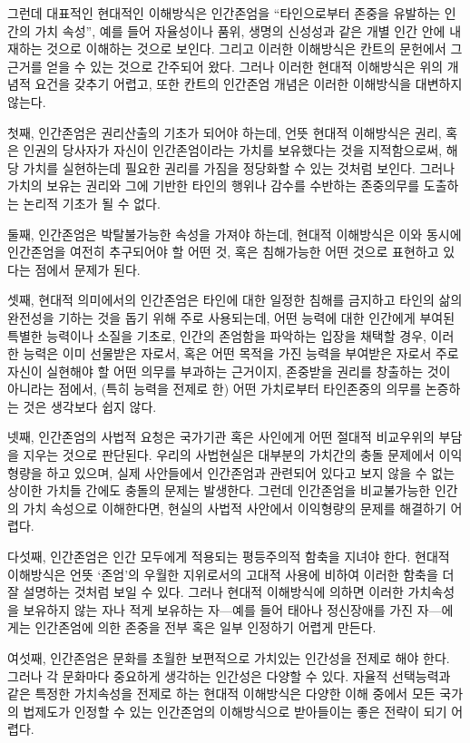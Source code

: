 그런데 대표적인 현대적인 이해방식은 인간존엄을 ``타인으로부터 존중을 유발하는 인간의 가치 속성'', 예를 들어 자율성이나 품위, 생명의 신성성과 같은 개별 인간 안에 내재하는 것으로 이해하는 것으로 보인다. 그리고 이러한 이해방식은 칸트의 문헌에서 그 근거를 얻을 수 있는 것으로 간주되어 왔다. 그러나 이러한 현대적 이해방식은 위의 개념적 요건을 갖추기 어렵고, 또한 칸트의 인간존엄 개념은 이러한 이해방식을 대변하지 않는다.

첫째, 인간존엄은 권리산출의 기초가 되어야 하는데, 언뜻 현대적 이해방식은 권리, 혹은 인권의 당사자가 자신이 인간존엄이라는 가치를 보유했다는 것을 지적함으로써, 해당 가치를 실현하는데 필요한 권리를 가짐을 정당화할 수 있는 것처럼 보인다. 그러나 가치의 보유는 권리와 그에 기반한 타인의 행위나 감수를 수반하는 존중의무를 도출하는 논리적 기초가 될 수 없다.

둘째, 인간존엄은 박탈불가능한 속성을 가져야 하는데, 현대적 이해방식은 이와 동시에 인간존엄을 여전히 추구되어야 할 어떤 것, 혹은 침해가능한 어떤 것으로 표현하고 있다는 점에서 문제가 된다.

셋째, 현대적 의미에서의 인간존엄은 타인에 대한 일정한 침해를 금지하고 타인의 삶의 완전성을 기하는 것을 돕기 위해 주로 사용되는데, 어떤 능력에 대한 인간에게 부여된 특별한 능력이나 소질을 기초로, 인간의 존엄함을 파악하는 입장을 채택할 경우, 이러한 능력은 이미 선물받은 자로서, 혹은 어떤 목적을 가진 능력을 부여받은 자로서 주로 자신이 실현해야 할 어떤 의무를 부과하는 근거이지, 존중받을 권리를 창출하는 것이 아니라는 점에서, (특히 능력을 전제로 한) 어떤 가치로부터 타인존중의 의무를 논증하는 것은 생각보다 쉽지 않다.

넷째, 인간존엄의 사법적 요청은 국가기관 혹은 사인에게 어떤 절대적 비교우위의 부담을 지우는 것으로 판단된다. 우리의 사법현실은 대부분의 가치간의 충돌 문제에서 이익형량을 하고 있으며, 실제 사안들에서 인간존엄과 관련되어 있다고 보지 않을 수 없는 상이한 가치들 간에도 충돌의 문제는 발생한다. 그런데 인간존엄을 비교불가능한 인간의 가치 속성으로 이해한다면, 현실의 사법적 사안에서 이익형량의 문제를 해결하기 어렵다.

다섯째, 인간존엄은 인간 모두에게 적용되는 평등주의적 함축을 지녀야 한다. 현대적 이해방식은 언뜻 `존엄'의 우월한 지위로서의 고대적 사용에 비하여 이러한 함축을 더 잘 설명하는 것처럼 보일 수 있다. 그러나 현대적 이해방식에 의하면 이러한 가치속성을 보유하지 않는 자나 적게 보유하는 자---예를 들어 태아나 정신장애를 가진 자---에게는 인간존엄에 의한 존중을 전부 혹은 일부 인정하기 어렵게 만든다.

여섯째, 인간존엄은 문화를 초월한 보편적으로 가치있는 인간성을 전제로 해야 한다. 그러나 각 문화마다 중요하게 생각하는 인간성은 다양할 수 있다. 자율적 선택능력과 같은 특정한 가치속성을 전제로 하는 현대적 이해방식은 다양한 이해 중에서 모든 국가의 법제도가 인정할 수 있는 인간존엄의 이해방식으로 받아들이는 좋은 전략이 되기 어렵다.

